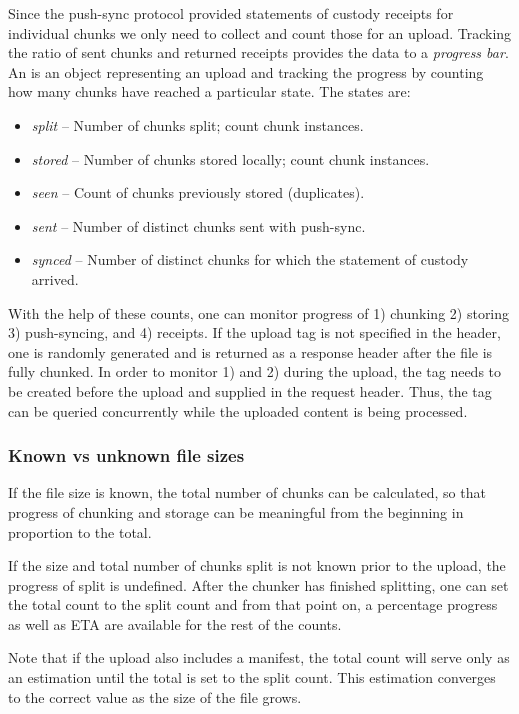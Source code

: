Since the push-sync protocol provided statements of custody receipts for individual chunks we only need to collect and count those for an upload. Tracking the ratio of sent chunks and returned receipts provides the data to a \emph{progress bar}. An  is an object representing an upload and tracking the progress by counting how many chunks have reached a particular state. The states are: 

\begin{itemize}[noitemsep]
\item \emph{split} -- Number of chunks split; count chunk instances.
\item \emph{stored} -- Number of chunks stored locally; count chunk instances.
\item \emph{seen} -- Count of chunks previously stored (duplicates).
\item \emph{sent} -- Number of distinct chunks sent with push-sync.
\item \emph{synced} -- Number of distinct chunks for which the statement of custody arrived.
\end{itemize}

With the help of these counts, one can monitor progress of 1) chunking 2) storing 3) push-syncing, and 4) receipts.
If the upload tag is not specified in the header, one is randomly generated and is returned as a response header after the file is fully chunked. In order to monitor 1) and  2) during the upload, the tag needs to be created before the upload and supplied in the request header. Thus, the tag can be queried concurrently while the uploaded content is being processed. 

\subsubsection{Known vs unknown file sizes}

If the file size is known, the total number of chunks can be calculated, so that progress of chunking and storage can be meaningful from the beginning in proportion to the total.

If the size and total number of chunks split is not known prior to the upload, the progress of split is undefined. After the chunker has finished splitting, one can set the total count to the split count and from that point on, a percentage progress as well as ETA are available for the rest of the counts.

Note that if the upload also includes a manifest, the total count will serve only as an estimation until the total is set to the split count. This estimation converges to the correct value as the size of the file grows.


